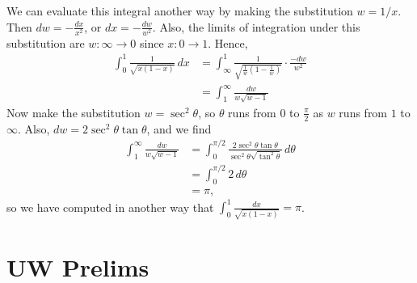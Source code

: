 \documentclass[11pt]{book}
\theoremstyle{definition}
\begin{document}
\begin{enumerate}
        We can evaluate this integral another way by making the substitution $w = 1/x$.  Then $dw = - \frac{dx}{x^2}$, or $dx = -\frac{dw}{w^2}$.   Also, the limits of integration under this substitution are $w : \infty \to 0$ since $x : 0\to 1$.  Hence,
        \begin{align*}
            \int_0^1 \frac{1}{\sqrt{x(1-x)}} \, dx &= \int_{\infty}^1 \frac{1}{\sqrt{\tfrac{1}{w} ( 1 - \tfrac 1 w) }} \cdot \frac{-dw}{w^2} \\
            &= \int_1^\infty \frac{dw }{w \sqrt{w-1}} 
        \end{align*}
        Now make the substitution $w = \sec^2 \theta$, so $\theta$ runs from $0$ to $\tfrac \pi 2$ as $w$ runs from $1$ to $\infty$.   Also, $dw = 2\sec^2 \theta \tan \theta$, and we find 
        \begin{align*}
            \int_1^\infty \frac{dw}{w \sqrt{w-1}}   &= \int_0^{\pi/2}  \frac{2\sec^2 \theta \tan \theta}{\sec^2 \theta \sqrt{\tan^2\theta}} \, d\theta \\
            &= \int_0^{\pi/2} 2 \, d\theta \\
            &= \pi,
        \end{align*}
        so we have computed in another way that $\int_0^1 \frac{dx}{\sqrt{x(1-x)}}  = \pi$. 
\end{enumerate}
\chapter{UW Prelims}
\end{document}
